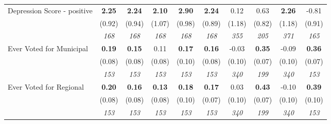 \begin{tabular}{l c c c c c c c c c}
Depression Score - positive & \textbf{ 2.25 } & \textbf{ 2.24 } & \textbf{ 2.10 } & \textbf{2.90} & \textbf{2.24} & 0.12 & 0.63 & \textbf{ 2.26 } & -0.81 \\
& (0.92) & (0.94) & (1.07) & (0.98) & (0.89) & (1.18) & (0.82) & (1.18) & (0.91) \\
& \textit{ 168 } & \textit{ 168 } & \textit{ 168 } & \textit{ 168 } & \textit{ 168 } & \textit{ 355 } & \textit{ 205 } & \textit{ 371 } & \textit{ 165 } \\
Ever Voted for Municipal & \textbf{ 0.19 } & \textbf{ 0.15 } & 0.11 & \textbf{0.17} & \textbf{0.16} & -0.03 & \textbf{0.35} & -0.09 & \textbf{0.36} \\
& (0.08) & (0.08) & (0.08) & (0.10) & (0.08) & (0.10) & (0.07) & (0.10) & (0.07) \\
& \textit{ 153 } & \textit{ 153 } & \textit{ 153 } & \textit{ 153 } & \textit{ 153 } & \textit{ 340 } & \textit{ 199 } & \textit{ 340 } & \textit{ 153 } \\
Ever Voted for Regional & \textbf{ 0.20 } & \textbf{ 0.16 } & \textbf{ 0.13 } & \textbf{0.18} & \textbf{0.17} & 0.03 & \textbf{0.43} & -0.10 & \textbf{0.39} \\
& (0.08) & (0.08) & (0.08) & (0.10) & (0.07) & (0.10) & (0.07) & (0.10) & (0.10) \\
& \textit{ 153 } & \textit{ 153 } & \textit{ 153 } & \textit{ 153 } & \textit{ 153 } & \textit{ 340 } & \textit{ 199 } & \textit{ 340 } & \textit{ 153 } \\
\bottomrule
\end{tabular}
